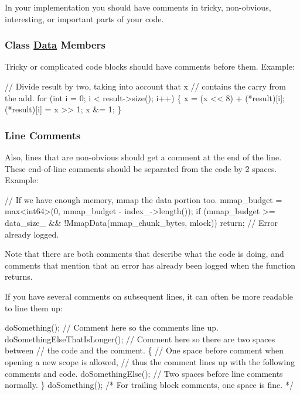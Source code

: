 In your implementation you should have comments in tricky, non-\/obvious, interesting, or important parts of your code.

\subsubsection*{Class \hyperlink{classData}{Data} Members}

Tricky or complicated code blocks should have comments before them. Example\+:


\begin{DoxyCode}
\textcolor{comment}{// Divide result by two, taking into account that x}
\textcolor{comment}{// contains the carry from the add.}
\textcolor{keywordflow}{for} (\textcolor{keywordtype}{int} i = 0; i < result->size(); i++) \{
    x = (x << 8) + (*result)[i];
    (*result)[i] = x >> 1;
    x &= 1;
\}
\end{DoxyCode}


\subsubsection*{Line Comments}

Also, lines that are non-\/obvious should get a comment at the end of the line. These end-\/of-\/line comments should be separated from the code by 2 spaces. Example\+:


\begin{DoxyCode}
\textcolor{comment}{// If we have enough memory, mmap the data portion too.}
mmap\_budget = max<int64>(0, mmap\_budget - index\_->length());
\textcolor{keywordflow}{if} (mmap\_budget >= data\_size\_ && !MmapData(mmap\_chunk\_bytes, mlock))
    \textcolor{keywordflow}{return};  \textcolor{comment}{// Error already logged.}
\end{DoxyCode}


Note that there are both comments that describe what the code is doing, and comments that mention that an error has already been logged when the function returns.

If you have several comments on subsequent lines, it can often be more readable to line them up\+:


\begin{DoxyCode}
doSomething();                  \textcolor{comment}{// Comment here so the comments line up.}
doSomethingElseThatIsLonger();  \textcolor{comment}{// Comment here so there are two spaces between}
                                \textcolor{comment}{// the code and the comment.}
\{ \textcolor{comment}{// One space before comment when opening a new scope is allowed,}
  \textcolor{comment}{// thus the comment lines up with the following comments and code.}
    doSomethingElse();  \textcolor{comment}{// Two spaces before line comments normally.}
\}
doSomething(); \textcolor{comment}{/* For trailing block comments, one space is fine. */}
\end{DoxyCode}


